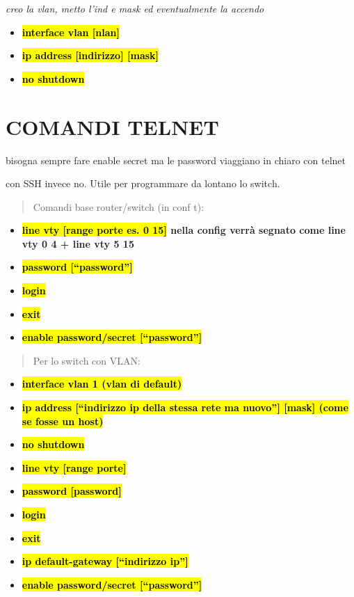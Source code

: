 \emph{creo la vlan, metto l'ind e mask ed eventualmente la accendo}

\begin{itemize}
\item
  \textbf{\hl{interface vlan {[}nlan{]}}}
\item
  \textbf{\hl{ip address {[}indirizzo{]} {[}mask{]}}}
\item
  \textbf{\hl{no shutdown}}
\end{itemize}

\section{COMANDI TELNET}\label{comandi-telnet}

bisogna sempre fare enable secret ma le password viaggiano in chiaro con
telnet

con SSH invece no. Utile per programmare da lontano lo switch.

\begin{quote}
Comandi base router/switch (in conf t):
\end{quote}

\begin{itemize}
\item
  \textbf{\hl{line vty {[}range porte es. 0 15{]}} nella config verrà
  segnato come line vty 0 4 + line vty 5 15}
\item
  \textbf{\hl{password {[}``password''{]}}}
\item
  \textbf{\hl{login}}
\item
  \textbf{\hl{exit}}
\item
  \textbf{\hl{enable password/secret {[}``password''{]}}}
\end{itemize}

\begin{quote}
Per lo switch con VLAN:
\end{quote}

\begin{itemize}
\item
  \textbf{\hl{interface vlan 1 (vlan di default)}}
\item
  \textbf{\hl{ip address {[}``indirizzo ip della stessa rete ma
  nuovo''{]} {[}mask{]} (come se fosse un host)}}
\item
  \textbf{\hl{no shutdown}}
\item
  \textbf{\hl{line vty {[}range porte{]}}}
\item
  \textbf{\hl{password {[}password{]}}}
\item
  \textbf{\hl{login}}
\item
  \textbf{\hl{exit}}
\item
  \textbf{\hl{ip default-gateway {[}``indirizzo ip''{]}}}
\item
  \textbf{\hl{enable password/secret {[}``password''{]}}}
\end{itemize}

